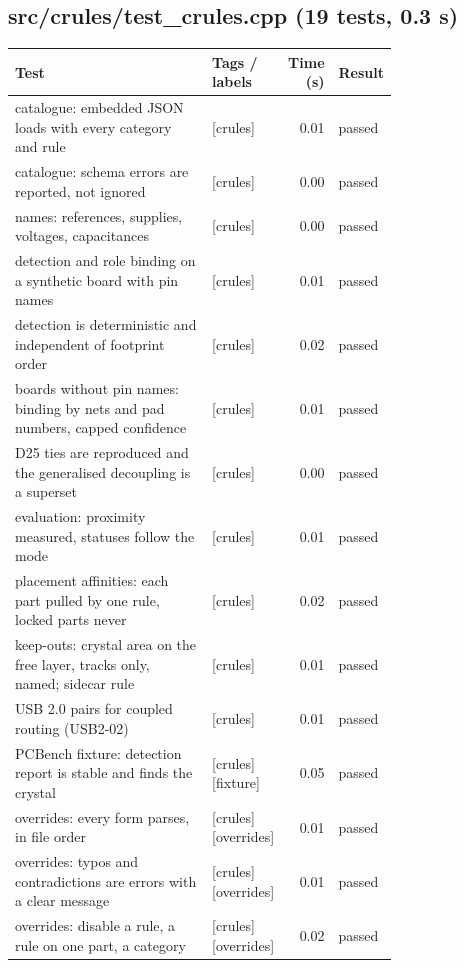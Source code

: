 \subsection*{src/\allowbreak{}crules/\allowbreak{}test\_\allowbreak{}crules.cpp (19 tests, 0.3 s)}
\begin{longtable}{@{}p{0.57\linewidth}p{0.19\linewidth}rl@{}}
\toprule Test & Tags / labels & Time (s) & Result \\ \midrule \endhead
catalogue: embedded JSON loads with every category and rule & {\footnotesize [crules]} & 0.01 & passed \\
catalogue: schema errors are reported, not ignored & {\footnotesize [crules]} & 0.00 & passed \\
names: references, supplies, voltages, capacitances & {\footnotesize [crules]} & 0.00 & passed \\
detection and role binding on a synthetic board with pin names & {\footnotesize [crules]} & 0.01 & passed \\
detection is deterministic and independent of footprint order & {\footnotesize [crules]} & 0.02 & passed \\
boards without pin names: binding by nets and pad numbers, capped confidence & {\footnotesize [crules]} & 0.01 & passed \\
D25 ties are reproduced and the generalised decoupling is a superset & {\footnotesize [crules]} & 0.00 & passed \\
evaluation: proximity measured, statuses follow the mode & {\footnotesize [crules]} & 0.01 & passed \\
placement affinities: each part pulled by one rule, locked parts never & {\footnotesize [crules]} & 0.02 & passed \\
keep-outs: crystal area on the free layer, tracks only, named; sidecar rule & {\footnotesize [crules]} & 0.01 & passed \\
USB 2.0 pairs for coupled routing (USB2-02) & {\footnotesize [crules]} & 0.01 & passed \\
PCBench fixture: detection report is stable and finds the crystal & {\footnotesize [crules][fixture]} & 0.05 & passed \\
overrides: every form parses, in file order & {\footnotesize [crules][overrides]} & 0.01 & passed \\
overrides: typos and contradictions are errors with a clear message & {\footnotesize [crules][overrides]} & 0.01 & passed \\
overrides: disable a rule, a rule on one part, a category & {\footnotesize [crules][overrides]} & 0.02 & passed \\

\end{longtable}

